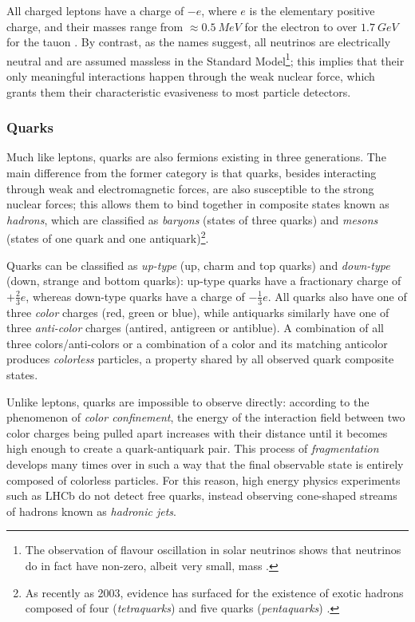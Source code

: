 All charged leptons have a charge of $-e$, where $e$ is the elementary positive charge, and their masses range from $\approx \SI{0.5}{MeV}$ for the electron to over $\SI{1.7}{GeV}$ for the tauon \cite{PDG}.
By contrast, as the names suggest, all neutrinos are electrically neutral and are assumed massless in the Standard Model\footnote{The observation of flavour oscillation in solar neutrinos shows that neutrinos do in fact have non-zero, albeit very small, mass \cite{SNO}.}; this implies that their only meaningful interactions happen through the weak nuclear force, which grants them their characteristic evasiveness to most particle detectors.


\subsubsection{Quarks}
Much like leptons, quarks are also fermions existing in three generations. The main difference from the former category is that quarks, besides interacting through weak and electromagnetic forces, are also susceptible to the strong nuclear forces; this allows them to bind together in composite states known as \textit{hadrons}, which are classified as \textit{baryons} (states of three quarks) and \textit{mesons} (states of one quark and one antiquark)\footnote{As recently as 2003, evidence has surfaced for the existence of exotic hadrons composed of four (\textit{tetraquarks}) \cite{tetraquark} and five quarks (\textit{pentaquarks}) \cite{pentaquark}.}.

Quarks can be classified as \textit{up-type} (up, charm and top quarks) and \textit{down-type} (down, strange and bottom quarks): up-type quarks have a fractionary charge of $+\frac{2}{3} e$, whereas down-type quarks have a charge of $-\frac{1}{3} e$. All quarks also have one of three \textit{color} charges (red, green or blue), while antiquarks similarly have one of three \textit{anti-color} charges (antired, antigreen or antiblue). A combination of all three colors/anti-colors or a combination of a color and its matching anticolor produces \textit{colorless} particles, a property shared by all observed quark composite states.

Unlike leptons, quarks are impossible to observe directly: according to the phenomenon of \textit{color confinement}, the energy of the interaction field between two color charges being pulled apart increases with their distance until it becomes high enough to create a quark-antiquark pair.
This process of \textit{fragmentation} develops many times over in such a way that the final observable state is entirely composed of colorless particles.
For this reason, high energy physics experiments such as LHCb do not detect free quarks, instead observing cone-shaped streams of hadrons known as \textit{hadronic jets}.

